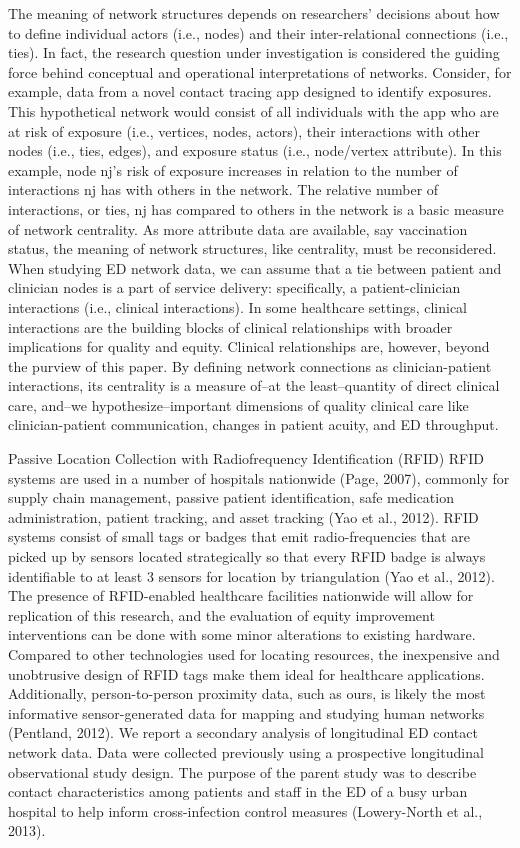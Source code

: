 \documentclass[
]{article}
\begin{document}
The meaning of network structures depends on researchers' decisions
about how to define individual actors (i.e., nodes) and their
inter-relational connections (i.e., ties). In fact, the research
question under investigation is considered the guiding force behind
conceptual and operational interpretations of networks. Consider, for
example, data from a novel contact tracing app designed to identify
exposures. This hypothetical network would consist of all individuals
with the app who are at risk of exposure (i.e., vertices, nodes,
actors), their interactions with other nodes (i.e., ties, edges), and
exposure status (i.e., node/vertex attribute). In this example, node
nj's risk of exposure increases in relation to the number of
interactions nj has with others in the network. The relative number of
interactions, or ties, nj has compared to others in the network is a
basic measure of network centrality. As more attribute data are
available, say vaccination status, the meaning of network structures,
like centrality, must be reconsidered. When studying ED network data, we
can assume that a tie between patient and clinician nodes is a part of
service delivery: specifically, a patient-clinician interactions (i.e.,
clinical interactions). In some healthcare settings, clinical
interactions are the building blocks of clinical relationships with
broader implications for quality and equity. Clinical relationships are,
however, beyond the purview of this paper. By defining network
connections as clinician-patient interactions, its centrality is a
measure of--at the least--quantity of direct clinical care, and--we
hypothesize--important dimensions of quality clinical care like
clinician-patient communication, changes in patient acuity, and ED
throughput.

Passive Location Collection with Radiofrequency Identification (RFID)
RFID systems are used in a number of hospitals nationwide (Page, 2007),
commonly for supply chain management, passive patient identification,
safe medication administration, patient tracking, and asset tracking
(Yao et al., 2012). RFID systems consist of small tags or badges that
emit radio-frequencies that are picked up by sensors located
strategically so that every RFID badge is always identifiable to at
least 3 sensors for location by triangulation (Yao et al., 2012). The
presence of RFID-enabled healthcare facilities nationwide will allow for
replication of this research, and the evaluation of equity improvement
interventions can be done with some minor alterations to existing
hardware. Compared to other technologies used for locating resources,
the inexpensive and unobtrusive design of RFID tags make them ideal for
healthcare applications. Additionally, person-to-person proximity data,
such as ours, is likely the most informative sensor-generated data for
mapping and studying human networks (Pentland, 2012). We report a
secondary analysis of longitudinal ED contact network data. Data were
collected previously using a prospective longitudinal observational
study design. The purpose of the parent study was to describe contact
characteristics among patients and staff in the ED of a busy urban
hospital to help inform cross-infection control measures (Lowery-North
et al., 2013).
\end{document}
